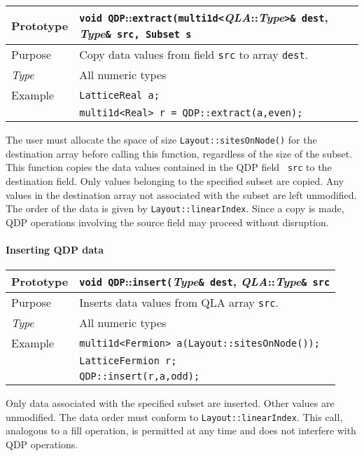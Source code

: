 \documentclass[12pt,letterpaper]{article}
\newcommand{\allNumericTypes}{All numeric types}
\newcommand{\ttdash}{{::}}
\newcommand{\itt}{\it Type}
\begin{document}
\begin{flushleft}
\begin{tabular}{|l|l|}
  \hline
  Prototype      & {\tt void QDP}\ttdash{\tt extract(multi1d<}{\it QLA}\ttdash{\it Type}{\tt >\& dest}, {\it Type}{\tt \& src, Subset s}\\
\hline
Purpose        & Copy data values from field {\tt src} to array {\tt dest}. \\
\hline
  \itt     & \allNumericTypes \\
\hline
Example  & \verb|LatticeReal a;| \\
         & \verb|multi1d<Real> r = QDP::extract(a,even);| \\
\hline
  \end{tabular}
\end{flushleft}
%
The user must allocate the space of size \verb|Layout::sitesOnNode()| for the 
destination array before calling this function, regardless of the size of
the subset.
This function copies the data values contained in the QDP field {\tt
src} to the destination field.  Only values belonging to the specified
subset are copied.  Any values in the destination array not associated
with the subset are left unmodified.  The order of the data is given
by \verb|Layout::linearIndex|.  Since a copy is made, QDP operations
involving the source field may proceed without disruption.

\paragraph{Inserting QDP data}

\begin{flushleft}
\begin{tabular}{|l|l|}
  \hline
  Prototype      & {\tt void QDP}\ttdash{\tt insert(}{\it Type}{\tt \& dest}, {\it QLA}\ttdash{\it Type}{\tt \& src}\\
\hline
Purpose        & Inserts data values from QLA array {\tt src}. \\
\hline
  \itt     & \allNumericTypes \\
\hline
Example  & \verb|multi1d<Fermion> a(Layout::sitesOnNode());|\\
         & \verb|LatticeFermion r;| \\
         & \verb|QDP::insert(r,a,odd);| \\
\hline
  \end{tabular}
\end{flushleft}
%
Only data associated with the specified subset are inserted.  Other
values are unmodified.  The data order must conform to
\verb|Layout::linearIndex|.  This call, analogous to a fill operation, is
permitted at any time and does not interfere with QDP operations.
\end{document}
